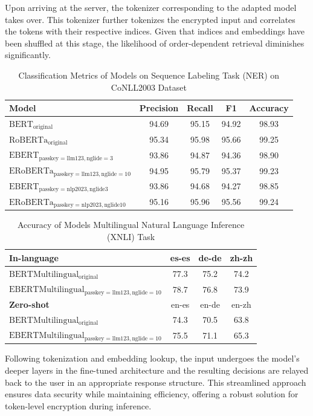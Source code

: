 \documentclass[letterpaper]{article} %
\begin{document}
Upon arriving at the server, the tokenizer corresponding to the adapted model takes over. This tokenizer further tokenizes the encrypted input and correlates the tokens with their respective indices. Given that indices and embeddings have been shuffled at this stage, the likelihood of order-dependent retrieval diminishes significantly.
\begin{table}[t]
    \centering
    \footnotesize
    \begin{tabular}{lcccc}
        \toprule
        \textbf{Model} & Precision & Recall & F1 & Accuracy \\
        \midrule
        $\mathrm{BERT_{original}}$ & 94.69 & 95.15 & 94.92 & 98.93  \\
        $\mathrm{RoBERTa_{original}}$ & 95.34 & 95.98 & 95.66 & 99.25 \\
        $\mathrm{EBERT_{passkey=llm123, nglide=3}}$  & 93.86 & 94.87 & 94.36 & 98.90 \\
        $\mathrm{ERoBERTa_{passkey=llm123, nglide=10}}$  & 94.95 & 95.79 & 95.37 & 99.23 \\
        $\mathrm{EBERT_{passkey=nlp2023, nglide3}}$  & 93.86 & 94.68 & 94.27 & 98.85 \\
        $\mathrm{ERoBERTa_{passkey=nlp2023, nglide10}}$ & 95.16 & 95.96 & 95.56 & 99.24 \\
        \bottomrule
    \end{tabular}
    \caption{Classification Metrics of Models on Sequence Labeling Task (NER) on CoNLL2003 Dataset}
    \label{tab:nerresults}
\end{table}
\begin{table}[t]
    \centering
    \footnotesize
    \begin{tabular}{lccc}
        \toprule
        \textbf{In-language} & es-es & de-de & zh-zh \\
        \midrule
        $\mathrm{BERTMultilingual_{original}}$ & 77.3 & 75.2 & 74.2 \\
        $\mathrm{EBERTMultilingual_{passkey=llm123, nglide=10}}$ & 78.7 & 76.8 & 73.9 \\
        \midrule
        \textbf{Zero-shot} & en-es & en-de & en-zh \\
        \midrule
        $\mathrm{BERTMultilingual_{original}}$ & 74.3 & 70.5 & 63.8 \\
        $\mathrm{EBERTMultilingual_{passkey=llm123, nglide=10}}$ & 75.5 & 71.1 & 65.3 \\
        \bottomrule
    \end{tabular}
    \caption{Accuracy of Models Multilingual Natural Language Inference (XNLI) Task}
    \label{tab:xnliresults}
\end{table}
Following tokenization and embedding lookup, the input undergoes the model's deeper layers in the fine-tuned architecture and the resulting decisions are relayed back to the user in an appropriate response structure. This streamlined approach ensures data security while maintaining efficiency, offering a robust solution for token-level encryption during inference.
\end{document}
